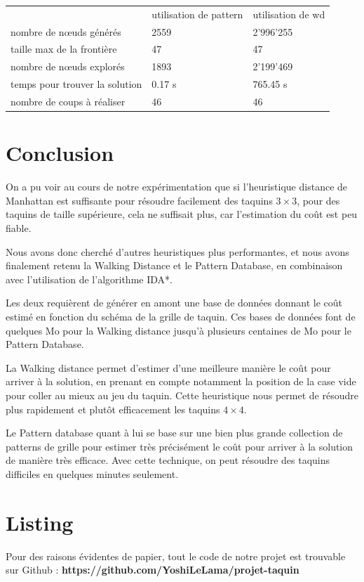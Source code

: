 \documentclass[a4paper, 12pt]{article}
\begin{document}
\begin{tabular}{|l|l|l|}
    \hline 
    & utilisation de pattern & utilisation de wd \\
    nombre de n\oe uds générés &  2559 & 2'996'255 \\
    taille max de la frontière & 47 & 47 \\
    nombre de n\oe uds explorés & 1893 & 2'199'469 \\
    temps pour trouver la solution & 0.17 s & 765.45 s \\
    nombre de coups à réaliser & 46 & 46 \\
\end{tabular}

\section{Conclusion}
On a pu voir au cours de notre expérimentation que si l'heuristique distance de Manhattan est suffisante pour résoudre facilement des taquins $3 \times 3$, pour des taquins de taille supérieure, cela ne suffisait plus, car l'estimation du coût est peu fiable.

Nous avons donc cherché d'autres heuristiques plus performantes, et nous avons finalement retenu la Walking Distance et le Pattern Database, en combinaison avec l'utilisation de l'algorithme IDA*.

Les deux requièrent de générer en amont une base de données donnant le coût estimé en fonction du schéma de la grille de taquin. Ces bases de données font de quelques Mo pour la Walking distance jusqu'à plusieurs centaines de Mo pour le Pattern Database.

La Walking distance permet d'estimer d'une meilleure manière le coût pour arriver à la solution, en prenant en compte notamment la position de la case vide pour coller au mieux au jeu du taquin. Cette heuristique nous permet de résoudre plus rapidement et plutôt efficacement les taquins $4 \times 4$.

Le Pattern database quant à lui se base sur une bien plus grande collection de patterns de grille pour estimer très précisément le coût pour arriver à la solution de manière très efficace. Avec cette technique, on peut résoudre des taquins difficiles en quelques minutes seulement.

\section{Listing}

Pour des raisons évidentes de papier, tout le code de notre projet est trouvable sur Github : \textbf{https://github.com/YoshiLeLama/projet-taquin}
\end{document}
